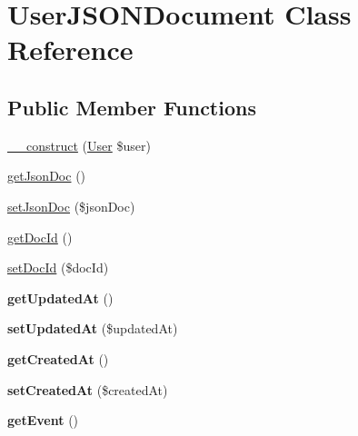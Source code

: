 \hypertarget{class_user_j_s_o_n_document}{\section{User\+J\+S\+O\+N\+Document Class Reference}
\label{class_user_j_s_o_n_document}
}
\subsection*{Public Member Functions}
\begin{DoxyCompactItemize}
\item 
\hyperlink{class_user_j_s_o_n_document_a449e259f0fcc2537e4ba6bc399e6a139}{\+\_\+\+\_\+construct} (\hyperlink{class_user}{User} \$user)
\item 
\hyperlink{class_user_j_s_o_n_document_aae5b452f6f5fd02ada80f134039354e3}{get\+Json\+Doc} ()
\item 
\hyperlink{class_user_j_s_o_n_document_a1f08feb6a944164520c4929531ca57b9}{set\+Json\+Doc} (\$json\+Doc)
\item 
\hyperlink{class_user_j_s_o_n_document_a87d709928426d7537de30a368b3cf4ab}{get\+Doc\+Id} ()
\item 
\hyperlink{class_user_j_s_o_n_document_a717889281baa3c165b58e34efce28fdb}{set\+Doc\+Id} (\$doc\+Id)
\item 
\hypertarget{class_user_j_s_o_n_document_a789bc1a92b41cf8c0958231bc1f27131}{{\bfseries get\+Updated\+At} ()}\label{class_user_j_s_o_n_document_a789bc1a92b41cf8c0958231bc1f27131}

\item 
\hypertarget{class_user_j_s_o_n_document_a154a3aa07459e180aee80106b8060cbd}{{\bfseries set\+Updated\+At} (\$updated\+At)}\label{class_user_j_s_o_n_document_a154a3aa07459e180aee80106b8060cbd}

\item 
\hypertarget{class_user_j_s_o_n_document_a0f0455d4aafe27d1b0720c3bcfff2847}{{\bfseries get\+Created\+At} ()}\label{class_user_j_s_o_n_document_a0f0455d4aafe27d1b0720c3bcfff2847}

\item 
\hypertarget{class_user_j_s_o_n_document_aab2c0066b72ff0696fde86c1d5b74538}{{\bfseries set\+Created\+At} (\$created\+At)}\label{class_user_j_s_o_n_document_aab2c0066b72ff0696fde86c1d5b74538}

\item 
\hypertarget{class_user_j_s_o_n_document_a055bcb2a2b197f7d31e1dd99d9eb62f7}{{\bfseries get\+Event} ()}\label{class_user_j_s_o_n_document_a055bcb2a2b197f7d31e1dd99d9eb62f7}


\end{DoxyCompactItemize}
